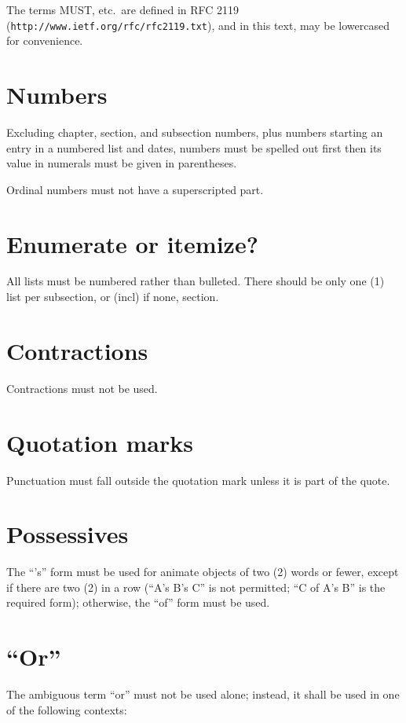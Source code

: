 \documentclass[10pt]{book}
\begin{document}
The terms MUST, etc.~are defined in RFC 2119 (\texttt{http://www.ietf.org/rfc/rfc2119.txt}), and in this text, may be lowercased for convenience.

\section{Numbers}

Excluding chapter, section, and subsection numbers, plus numbers starting an entry in a numbered list and dates, numbers must be spelled out first then its value in numerals must be given in parentheses.

Ordinal numbers must not have a superscripted part.

\section{Enumerate or itemize?}

All lists must be numbered rather than bulleted. There should be only one (1) list per subsection, or (incl) if none, section.

\section{Contractions}

Contractions must not be used.

\section{Quotation marks}

Punctuation must fall outside the quotation mark unless it is part of the quote.

\section{Possessives}

The ``'s'' form must be used for animate objects of two (2) words or fewer, except if there are two (2) in a row (``A's B's C'' is not permitted; ``C of A's B'' is the required form); otherwise, the ``of'' form must be used.

\section{``Or''}

The ambiguous term ``or'' must not be used alone; instead, it shall be used in one of the following contexts:
\end{document}
